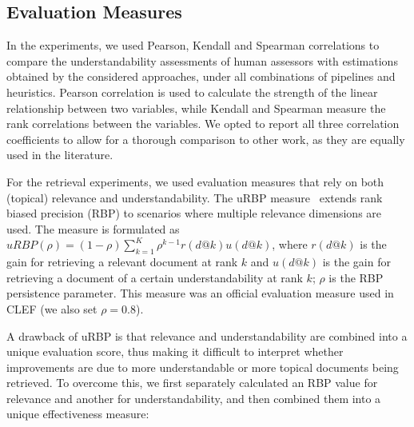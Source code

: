 \subsection{Evaluation Measures}

In the experiments, we used Pearson, Kendall and Spearman correlations to compare the understandability assessments of human assessors with estimations obtained by the considered approaches, under all combinations of pipelines and heuristics. Pearson correlation is used to calculate the strength of the linear relationship between two variables, while Kendall and Spearman measure the rank correlations between the variables. We opted to report all three correlation coefficients to allow for a thorough comparison to other work, as they are equally used in the literature. 

For the retrieval experiments, we used evaluation measures that rely on both (topical) relevance and understandability. 
The uRBP measure~\cite{zuccon2016understandability} extends rank biased precision (RBP) to scenarios where multiple relevance dimensions are used. The measure is formulated as $uRBP(\rho) = (1 - \rho) \sum_{k=1}^{K} \rho^{k-1} r(d@k) u(d@k)$, where $r(d@k)$ is the gain for retrieving a relevant document at rank $k$ and $u(d@k)$ is the gain for retrieving a document of a certain understandability at rank $k$; $\rho$ is the RBP persistence parameter. This measure was an official evaluation measure used in CLEF (we also set $\rho=0.8$). 

A drawback of uRBP is that relevance and understandability are combined into a unique evaluation score, thus making it difficult to interpret whether improvements are due to more understandable or more topical documents being retrieved. To overcome this, we first separately calculated an RBP value for relevance and another for understandability, and then combined them into a unique effectiveness measure:

